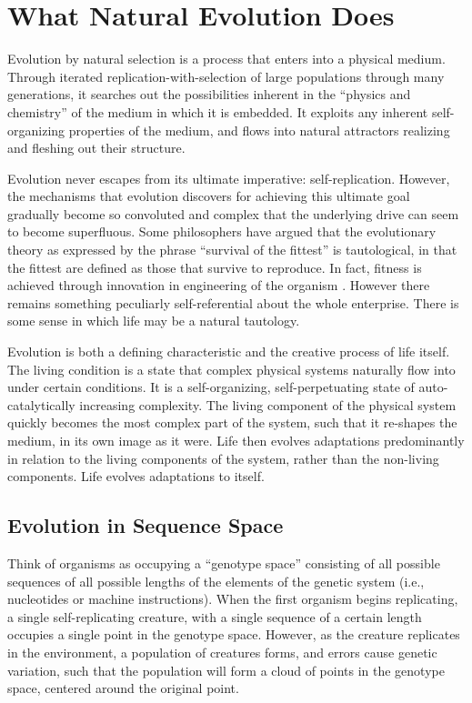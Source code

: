\section{What Natural Evolution Does}

Evolution by natural selection is a process that enters into
a physical medium.  Through iterated replication-with-selection of
large populations through many generations, it searches out the
possibilities inherent in the ``physics and chemistry'' of the
medium in which it is embedded.  It exploits any inherent self-organizing
properties of the medium, and flows into natural attractors realizing
and fleshing out their structure.

Evolution never escapes from its ultimate imperative: self-replication.
However, the mechanisms that evolution discovers for achieving this
ultimate goal gradually become so convoluted and complex that the
underlying drive can seem to become superfluous.  Some philosophers have
argued that the evolutionary theory as expressed by the phrase ``survival
of the fittest'' is tautological, in that the fittest are defined as
those that survive to reproduce.  In fact, fitness is achieved through
innovation in engineering of the organism \cite{Sobe}.  However there
remains something peculiarly self-referential about the whole enterprise.
There is some sense in which life may be a natural tautology.

Evolution is both a defining characteristic and the creative process
of life itself.  The living condition is a state that complex physical
systems naturally flow into under certain conditions.  It is a
self-organizing, self-perpetuating state of auto-catalytically increasing
complexity.  The living component of the physical system quickly becomes
the most complex part of the system, such that it re-shapes the medium,
in its own image as it were.  Life then evolves adaptations predominantly
in relation to the living components of the system, rather than the
non-living components.  Life evolves adaptations to itself.

\subsection{Evolution in Sequence Space}

Think of organisms as occupying a ``genotype space'' consisting of
all possible sequences of all possible lengths of the
elements of the genetic system (i.e., nucleotides or machine instructions).
When the first organism begins replicating, a single self-replicating
creature, with a single sequence of a certain length occupies a single
point in the genotype space.  However, as the creature replicates in the
environment, a population of creatures forms, and errors cause genetic
variation, such that the population will form a cloud of points in the
genotype space, centered around the original point.

